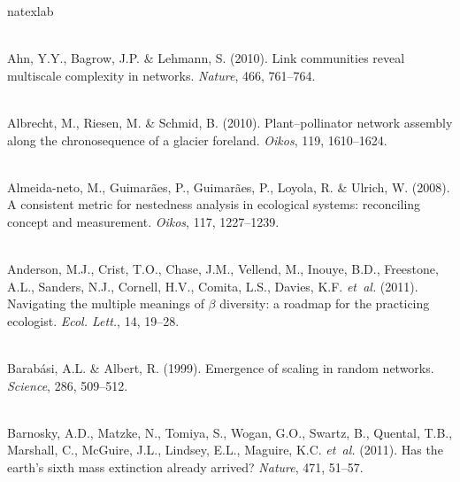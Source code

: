 \documentclass[12pt]{article}
\begin{document}
\begin{thebibliography}{67}
\expandafter\ifx\csname natexlab\endcsname\relax\def\natexlab#1{#1}\fi

\hspace{0em}\\Ahn, Y.Y., Bagrow, J.P. \& Lehmann, S. (2010).
\newblock Link communities reveal multiscale complexity in networks.
\newblock \emph{Nature}, 466, 761--764.

\hspace{0em}\\Albrecht, M., Riesen, M. \& Schmid, B. (2010).
\newblock Plant--pollinator network assembly along the chronosequence of a
  glacier foreland.
\newblock \emph{Oikos}, 119, 1610--1624.

\hspace{0em}\\Almeida-neto, M., Guimar\~{a}es, P., Guimar{\~a}es, P., Loyola,
  R. \& Ulrich, W. (2008).
\newblock A consistent metric for nestedness analysis in ecological systems:
  reconciling concept and measurement.
\newblock \emph{Oikos}, 117, 1227--1239.

\hspace{0em}\\Anderson, M.J., Crist, T.O., Chase, J.M., Vellend, M., Inouye,
  B.D., Freestone, A.L., Sanders, N.J., Cornell, H.V., Comita, L.S., Davies,
  K.F. \emph{et~al.} (2011).
\newblock Navigating the multiple meanings of $\beta$ diversity: a roadmap for
  the practicing ecologist.
\newblock \emph{Ecol. Lett.}, 14, 19--28.

\hspace{0em}\\Barab{\'a}si, A.L. \& Albert, R. (1999).
\newblock Emergence of scaling in random networks.
\newblock \emph{Science}, 286, 509--512.

\hspace{0em}\\Barnosky, A.D., Matzke, N., Tomiya, S., Wogan, G.O., Swartz, B.,
  Quental, T.B., Marshall, C., McGuire, J.L., Lindsey, E.L., Maguire, K.C.
  \emph{et~al.} (2011).
\newblock Has the earth's sixth mass extinction already arrived?
\newblock \emph{Nature}, 471, 51--57.


\end{thebibliography}
\end{document}
